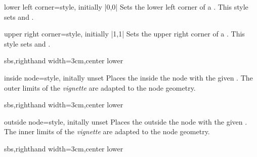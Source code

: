 \begin{vigTcbKey}[][doc new=2016-04-22]{lower left corner}{=}{style, initially |0,0|}
  Sets the lower left corner of a .
  This style sets  and .
\end{vigTcbKey}

\begin{vigTcbKey}[][doc new=2016-04-22]{upper right corner}{=}{style, initially |1,1|}
  Sets the upper right corner of a .
  This style sets  and .
\end{vigTcbKey}


\begin{dispExample*}{sbs,righthand width=3cm,center lower}
\end{dispExample*}

\enlargethispage*{1cm}

\begin{vigTcbKey}[][doc new=2016-04-22]{inside node}{=}{style, initally unset}
  Places the  inside the node with the given .
  The outer limits of the \emph{vignette} are adapted to the node geometry.
\begin{dispExample*}{sbs,righthand width=3cm,center lower}
\end{dispExample*}
\end{vigTcbKey}

\clearpage

\begin{vigTcbKey}[][doc new=2016-04-22]{outside node}{=}{style, initally unset}
  Places the  outside the node with the given .
  The inner limits of the \emph{vignette} are adapted to the node geometry.
\begin{dispExample*}{sbs,righthand width=3cm,center lower}
\end{dispExample*}
\end{vigTcbKey}


